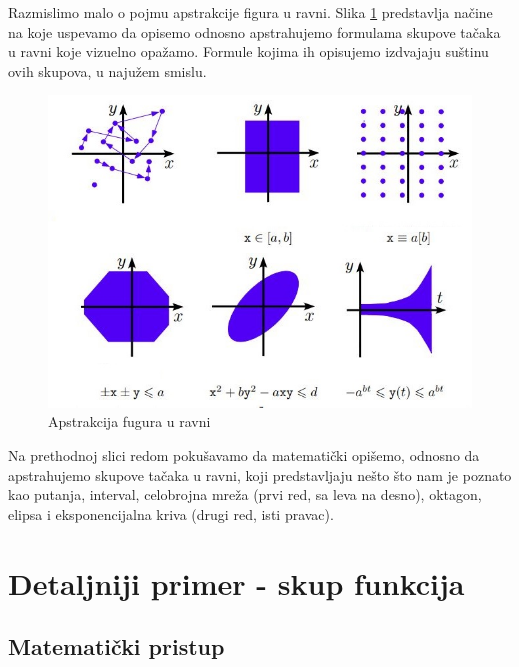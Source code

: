 \documentclass[a4paper]{article}
\begin{document}
Razmislimo malo o pojmu apstrakcije figura u ravni. Slika \ref{fig:numeric} predstavlja načine na koje uspevamo da opisemo odnosno apstrahujemo formulama skupove tačaka u ravni koje vizuelno opažamo. Formule kojima ih opisujemo izdvajaju suštinu ovih skupova, u najužem smislu.
\begin{figure}[h!]
\begin{center}
\includegraphics[scale=0.5]{numeric.JPG}
\end{center}
\caption{Apstrakcija fugura u ravni}
\label{fig:numeric}
\end{figure}\newline
Na prethodnoj slici redom pokušavamo da matematički opišemo, odnosno da apstrahujemo skupove tačaka u ravni, koji predstavljaju nešto što nam je poznato kao putanja, interval, celobrojna mreža (prvi red, sa leva na desno), oktagon, elipsa i eksponencijalna kriva (drugi red, isti pravac).


\section{Detaljniji primer - skup funkcija}
\subsection{Matematički pristup}
\end{document}
